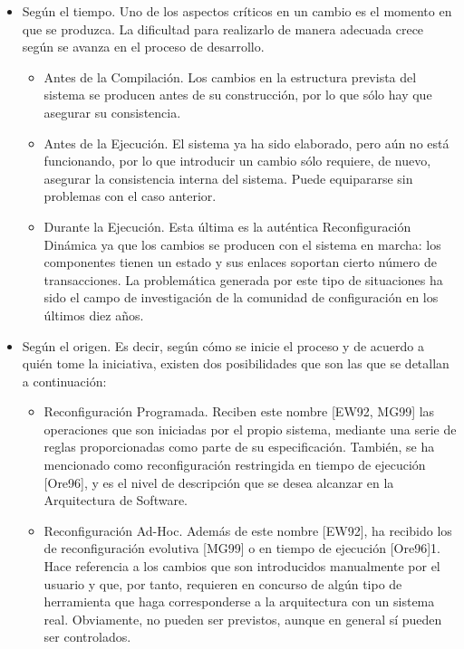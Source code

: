 \begin{itemize}
 
\item Según el tiempo. Uno de los aspectos críticos en un cambio es el
momento en que se produzca. La dificultad para realizarlo de manera adecuada
crece según se avanza en el proceso de desarrollo.

\begin{itemize}
\item Antes de la Compilación. Los cambios en la estructura prevista del
sistema se producen antes de su construcción, por lo que sólo hay que asegurar
su consistencia.

\item Antes de la Ejecución. El sistema ya ha sido elaborado, pero aún no
está funcionando, por lo que introducir un cambio sólo requiere, de nuevo,
asegurar la consistencia interna del sistema. Puede equipararse sin problemas
con el caso anterior.

\item Durante la Ejecución. Esta última es la auténtica Reconfiguración
Dinámica ya que los cambios se producen con el sistema en marcha: los componentes
tienen un estado y sus enlaces soportan cierto número de transacciones. La
problemática generada por este tipo de situaciones ha sido el campo de
investigación de la comunidad de configuración en los últimos diez años.
\end{itemize}

\item Según el origen. Es decir, según cómo se inicie el proceso y de acuerdo a quién tome la iniciativa, existen dos posibilidades que son las
que se detallan a continuación: 

\begin{itemize}

 \item Reconfiguración Programada. Reciben este nombre [EW92, MG99] las
operaciones que son iniciadas por el propio sistema, mediante una serie de
reglas proporcionadas como parte de su especificación. También, se ha mencionado
como reconfiguración restringida en tiempo de ejecución [Ore96], y es el
nivel de descripción que se desea alcanzar en la Arquitectura de Software.

\item Reconfiguración Ad-Hoc. Además de este nombre [EW92], ha recibido los
de reconfiguración evolutiva [MG99] o en tiempo de ejecución [Ore96]1. Hace
referencia a los cambios que son introducidos manualmente por el usuario y que,
por tanto, requieren en concurso de algún tipo de herramienta que haga
corresponderse a la arquitectura con un sistema real. Obviamente, no pueden ser
previstos, aunque en general sí pueden ser controlados.

\end{itemize}

\end{itemize}



